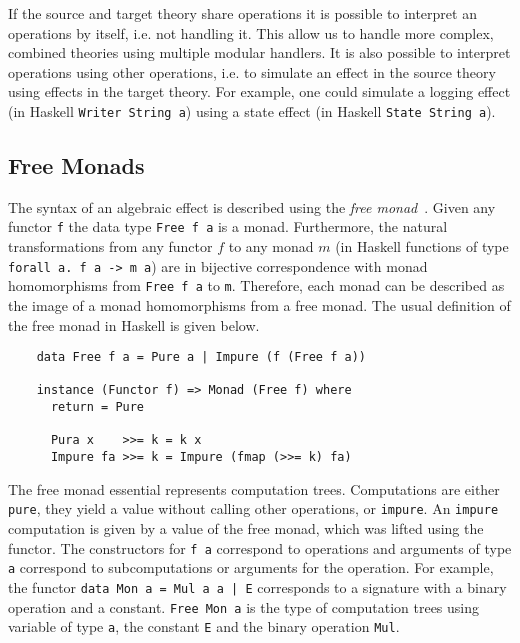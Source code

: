 If the source and target theory share operations it is possible to interpret an
operations by itself, i.e. not handling it.
This allow us to handle more complex, combined theories using multiple modular
handlers.
It is also possible to interpret operations using other operations, i.e. to
simulate an effect in the source theory using effects in the target theory.
For example, one could simulate a logging effect (in Haskell \texttt{Writer String
  a}) using a state effect (in Haskell \texttt{State String a}).


\subsection{Free Monads}
\label{preliminaries:free-monad}

The syntax of an algebraic effect is described using the \textit{free
monad}~\cite{DBLP:journals/jfp/Swierstra08}.
Given any functor \texttt{f} the data type \texttt{Free f a} is a monad.
Furthermore, the natural transformations from any functor $f$ to any monad $m$
(in Haskell functions of type \texttt{forall a. f a -> m a}) are in bijective
correspondence with monad homomorphisms from \texttt{Free f a} to \texttt{m}.
Therefore, each monad can be described as the image of a monad homomorphisms
from a free monad.
The usual definition of the free monad in Haskell is given below.

\begin{verbatim}
    data Free f a = Pure a | Impure (f (Free f a))

    instance (Functor f) => Monad (Free f) where
      return = Pure

      Pura x    >>= k = k x
      Impure fa >>= k = Impure (fmap (>>= k) fa)
\end{verbatim}
The free monad essential represents computation trees.
Computations are either \texttt{pure}, they yield a value without calling
other operations, or \texttt{impure}.
An \texttt{impure} computation is given by a value of the free monad, which was
lifted using the functor.
The constructors for \texttt{f a} correspond to operations and arguments of type
\texttt{a} correspond to subcomputations or arguments for the operation.
For example, the functor \texttt{data Mon a = Mul a a | E}
corresponds to a signature with a binary operation and a constant.
\texttt{Free Mon a} is the type of computation trees using variable
of type \texttt{a}, the constant \texttt{E} and the binary operation
\texttt{Mul}.


